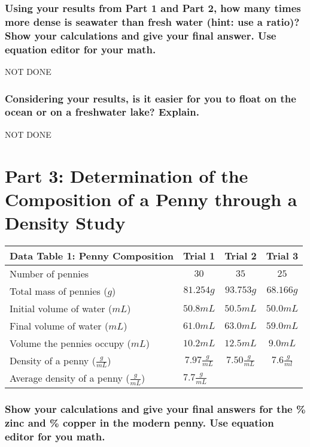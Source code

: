 \documentclass[a4paper,10pt]{article}
\begin{document}
\subsubsection*{Using your results from Part 1 and Part 2, how many times more dense is seawater than fresh water (hint: use a ratio)? Show your calculations and give your final answer. Use equation editor for your math.}
NOT DONE

\subsubsection*{Considering your results, is it easier for you to float on the ocean or on a freshwater lake? Explain.}

NOT DONE

\section{Part 3: Determination of the Composition of a Penny through a Density Study}

\begin{table}[h!]
\renewcommand{\arraystretch}{1.5}
\label{tab:table1}
\begin{tabular}{|l|c|c|c|}
\hline
\textbf{Data Table 1: Penny Composition} & \textbf{Trial 1} & \textbf{Trial 2} & \textbf{Trial 3}\\
\hline
Number of pennies & $30$ & $35$ & $25$ \\
\hline
Total mass of pennies ($g$) & $81.254g$ & $93.753g$ & $68.166g$ \\
\hline
Initial volume of water ($mL$) & $50.8mL$ & $50.5mL$ & $50.0mL$ \\
\hline
Final volume of water ($mL$) & $61.0mL$ & $63.0mL$ & $59.0mL$ \\
\hline
Volume the pennies occupy ($mL$) & $10.2mL$ & $12.5mL$ & $9.0mL$ \\
\hline
Density of a penny ($\frac{g}{mL}$) & $7.97\frac{g}{mL}$ & $7.50\frac{g}{mL}$ & $7.6\frac{g}{ml}$\\
\hline
Average density of a penny ($\frac{g}{mL}$) & \multicolumn{2}{l}{$7.7\frac{g}{mL}$} & \\
\hline
\end{tabular}
\end{table}

\subsubsection*{Show your calculations and give your final answers for the \% zinc and \% copper in the modern penny. Use equation editor for you math.}
\end{document}
